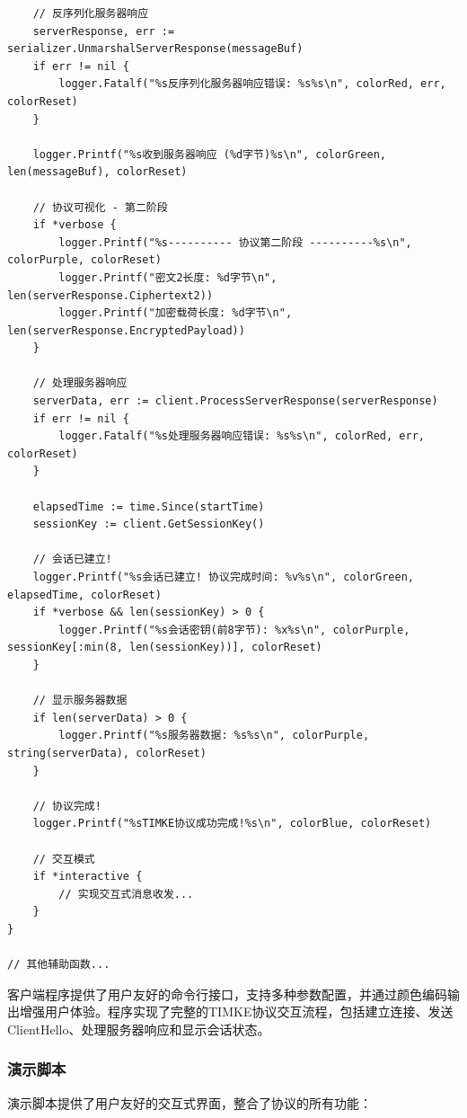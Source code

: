 \begin{verbatim}
    // 反序列化服务器响应
    serverResponse, err := serializer.UnmarshalServerResponse(messageBuf)
    if err != nil {
        logger.Fatalf("%s反序列化服务器响应错误: %s%s\n", colorRed, err, colorReset)
    }

    logger.Printf("%s收到服务器响应 (%d字节)%s\n", colorGreen, len(messageBuf), colorReset)

    // 协议可视化 - 第二阶段
    if *verbose {
        logger.Printf("%s---------- 协议第二阶段 ----------%s\n", colorPurple, colorReset)
        logger.Printf("密文2长度: %d字节\n", len(serverResponse.Ciphertext2))
        logger.Printf("加密载荷长度: %d字节\n", len(serverResponse.EncryptedPayload))
    }

    // 处理服务器响应
    serverData, err := client.ProcessServerResponse(serverResponse)
    if err != nil {
        logger.Fatalf("%s处理服务器响应错误: %s%s\n", colorRed, err, colorReset)
    }

    elapsedTime := time.Since(startTime)
    sessionKey := client.GetSessionKey()

    // 会话已建立!
    logger.Printf("%s会话已建立! 协议完成时间: %v%s\n", colorGreen, elapsedTime, colorReset)
    if *verbose && len(sessionKey) > 0 {
        logger.Printf("%s会话密钥(前8字节): %x%s\n", colorPurple, sessionKey[:min(8, len(sessionKey))], colorReset)
    }

    // 显示服务器数据
    if len(serverData) > 0 {
        logger.Printf("%s服务器数据: %s%s\n", colorPurple, string(serverData), colorReset)
    }

    // 协议完成!
    logger.Printf("%sTIMKE协议成功完成!%s\n", colorBlue, colorReset)

    // 交互模式
    if *interactive {
        // 实现交互式消息收发...
    }
}

// 其他辅助函数...
\end{verbatim}

客户端程序提供了用户友好的命令行接口，支持多种参数配置，并通过颜色编码输出增强用户体验。程序实现了完整的TIMKE协议交互流程，包括建立连接、发送ClientHello、处理服务器响应和显示会话状态。

\subsubsection{演示脚本}

演示脚本提供了用户友好的交互式界面，整合了协议的所有功能：

